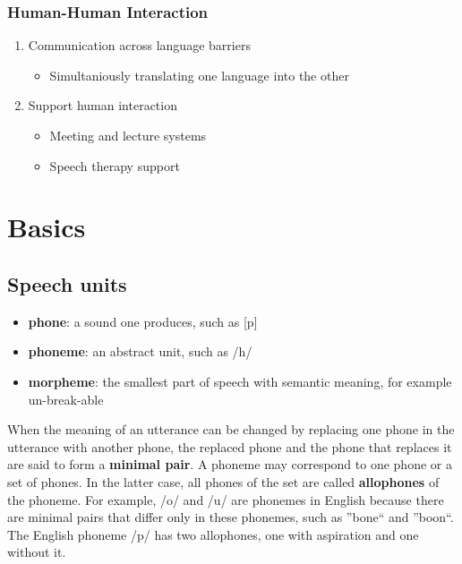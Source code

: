 \documentclass[11pt]{article}
\begin{document}
\subsubsection{Human-Human Interaction}
\begin{enumerate}
\item Communication across language barriers
\begin{itemize}
\item Simultaniously translating one language into the other
\end{itemize}

\item Support human interaction
\begin{itemize}
\item Meeting and lecture systems
\item Speech therapy support

\end{itemize}


\end{enumerate}



\section{Basics}

\subsection{Speech units}

\begin{itemize}
    \item \textbf{phone}: a sound one produces, such as [p]
    \item \textbf{phoneme}: an abstract unit, such as /h/
    \item \textbf{morpheme}: the smallest part of speech with semantic meaning, for example un-break-able
\end{itemize}

When the meaning of an utterance can be changed by replacing one phone in the utterance with another phone, the replaced phone and the phone that replaces it are said to form a \textbf{minimal pair}.
A phoneme may correspond to one phone or a set of phones. In the latter case, all phones of the set are called \textbf{allophones} of the phoneme.
For example, /o/ and /u/ are phonemes in English because there are minimal pairs that differ only in these phonemes, such as ''bone`` and ''boon``. The English phoneme /p/ has two allophones, one with aspiration and one without it.
\end{document}
